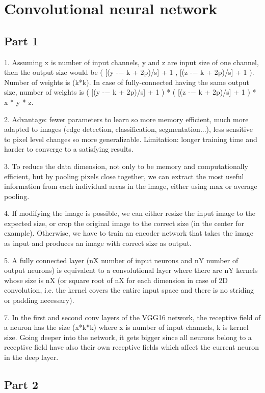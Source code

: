 \section{Convolutional neural network}

\subsection{Part 1}

1. Assuming x is number of input channels, y and z are input size of one channel, then the output size would be ( [(y -− k + 2p)/s] + 1 , [(z -− k + 2p)/s] + 1 ). Number of weights is (k*k). In case of fully-connected having the same output size, number of weights is ( [(y -− k + 2p)/s] + 1 ) * ( [(z -− k + 2p)/s] + 1 ) * x * y * z.

2. Advantage: fewer parameters to learn so more memory efficient, much more adapted to images (edge detection, classification, segmentation...), less sensitive to pixel level changes so more generalizable. Limitation: longer training time and harder to converge to a satisfying results.

3. To reduce the data dimension, not only to be memory and computationally efficient, but by pooling pixels close together, we can extract the most useful information from each individual areas in the image, either using max or average pooling.

4. If modifying the image is possible, we can either resize the input image to the expected size, or crop the original image to the correct size (in the center for example). Otherwise, we have to train an encoder network that takes the image as input and produces an image with correct size as output.

5. A fully connected layer (nX number of input neurons and nY number of output neurons) is equivalent to a convolutional layer where there are nY kernels whose size is nX (or square root of nX for each dimension in case of 2D convolution, i.e. the kernel covers the entire input space and there is no striding or padding necessary).

7. In the first and second conv layers of the VGG16 network, the receptive field of a neuron has the size (x*k*k) where x is number of input channels, k is kernel size. Going deeper into the network, it gets bigger since all neurons belong to a receptive field have also their own receptive fields which affect the current neuron in the deep layer.

\subsection{Part 2}

